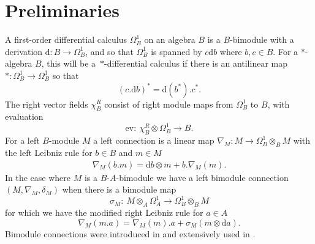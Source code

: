 \documentclass[10pt,a4paper]{amsart}
\numberwithin{equation}{section}
\newcommand{\ev}{\mathrm{ev}}
\newcommand{\extd}{\mathrm{d}}
\newcommand{\tens}{\mathop{\otimes}}
\newcommand{\<}{\langle}
\renewcommand{\>}{\rangle}
\begin{document}
\section{Preliminaries}\label{Prelim}
A first-order differential calculus $ \Omega_{B}^{1} $ on an algebra $ B $ is a $ B$-bimodule with a derivation \linebreak \mbox{$ \extd \colon B \rightarrow \Omega_{B}^{1} $}, and so that $ \Omega_{B}^{1} $ is spanned by $ c \extd b $ where $ b, c \in B$. For a $ * $-algebra $B$, this will be a~$*$-differential calculus if there is an antilinear map $ *\colon \Omega_{B}^{1} \rightarrow \Omega_{B}^{1}$ so that
\[(c. \extd b)^{*}=\extd (b^{*}). c^{*}.\]
The right vector fields $ \chi_{B}^{R} $ consist of right module maps from $ \Omega_{B}^{1} $ to $ B $, with evaluation
\[ \ev\colon \ \chi_{B}^{R} \tens \Omega_{B}^{1} \rightarrow B.
\] For a left $ B $-module $ M $ a left connection is a linear map $ \nabla_{M}\colon M \rightarrow \Omega_{B}^{1} \tens_{B} M$ with the left Leibniz rule for $ b\in B $ and $ m \in M $
\begin{align}\label{e73}
	\nabla_{M}(b. m)=\extd b \tens m+b. \nabla_{M}(m).
\end{align}
In the case where $ M$ is a $ B$-$A $-bimodule we have a left bimodule connection $ (M, \nabla_{M}, \delta_{M}) $ when there is a bimodule map
\[\sigma_{M}\colon \ M \tens_{A} \Omega_{A}^{1} \rightarrow \Omega_{B}^{1} \tens_{B} M\]
for which we have the modified right Leibniz rule for $ a\in A $
\[\nabla_{M}(m. a)=\nabla_{M}(m). a +\sigma_{M}(m \tens \extd a). \]
Bimodule connections were introduced in \cite{DuboisMasson,DuboisMichor,Mourad} and extensively used in \cite{FioreMadore, Madore}.
\end{document}
